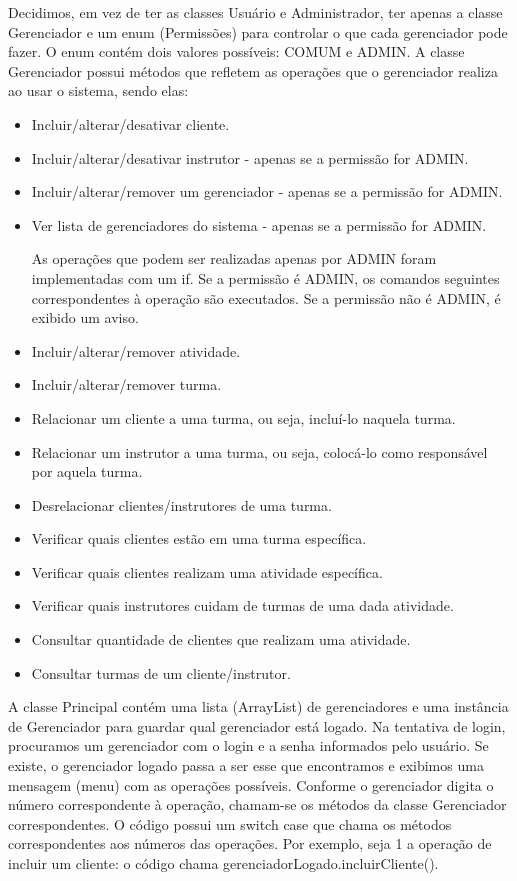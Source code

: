 \documentclass[11pt,twoside]{article}
\begin{document}
Decidimos, em vez de ter as classes Usuário e Administrador, ter apenas a classe Gerenciador e um enum (Permissões) para controlar
o que cada gerenciador pode fazer. O enum contém dois valores possíveis: COMUM e ADMIN. A classe Gerenciador possui métodos que
refletem as operações que o gerenciador realiza ao usar o sistema, sendo elas:
\begin{itemize}
  \item Incluir/alterar/desativar cliente.
  \item Incluir/alterar/desativar instrutor - apenas se a permissão for ADMIN.
  \item Incluir/alterar/remover um gerenciador - apenas se a permissão for ADMIN.
  \item Ver lista de gerenciadores do sistema - apenas se a permissão for ADMIN.

  As operações que podem ser realizadas apenas por ADMIN foram implementadas com um if. Se a permissão é ADMIN, os comandos
  seguintes correspondentes à operação são executados. Se a permissão não é ADMIN, é exibido um aviso.

  \item Incluir/alterar/remover atividade.
  \item Incluir/alterar/remover turma.
  \item Relacionar um cliente a uma turma, ou seja, incluí-lo naquela turma.
  \item Relacionar um instrutor a uma turma, ou seja, colocá-lo como responsável por aquela turma.
  \item Desrelacionar clientes/instrutores de uma turma.
  \item Verificar quais clientes estão em uma turma específica.
  \item Verificar quais clientes realizam uma atividade específica.
  \item Verificar quais instrutores cuidam de turmas de uma dada atividade.
  \item Consultar quantidade de clientes que realizam uma atividade.
  \item Consultar turmas de um cliente/instrutor.
\end{itemize}

A classe Principal contém uma lista (ArrayList) de gerenciadores e uma instância de  Gerenciador para guardar qual gerenciador
está logado.
Na tentativa de login, procuramos um gerenciador com o login e a senha informados pelo usuário.
Se existe, o gerenciador logado passa a ser esse que encontramos e exibimos uma mensagem (menu) com as operações possíveis.
Conforme o gerenciador digita o número correspondente à operação, chamam-se os métodos da classe Gerenciador correspondentes.
O código possui um switch case que chama os métodos correspondentes aos números das operações. Por exemplo, seja 1 a operação de
incluir um cliente: o código chama gerenciadorLogado.incluirCliente().
\end{document}
